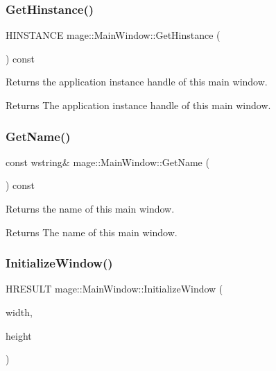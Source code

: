 \subsubsection{\texorpdfstring{Get\+Hinstance()}{GetHinstance()}}
{\footnotesize\ttfamily H\+I\+N\+S\+T\+A\+N\+CE mage\+::\+Main\+Window\+::\+Get\+Hinstance (\begin{DoxyParamCaption}{ }\end{DoxyParamCaption}) const}

Returns the application instance handle of this main window.

\begin{DoxyReturn}{Returns}
The application instance handle of this main window. 
\end{DoxyReturn}
\hypertarget{classmage_1_1_main_window_aa2b99118a5125d4effbd5c5d9352e7e0}{}\label{classmage_1_1_main_window_aa2b99118a5125d4effbd5c5d9352e7e0} 
\subsubsection{\texorpdfstring{Get\+Name()}{GetName()}}
{\footnotesize\ttfamily const wstring\& mage\+::\+Main\+Window\+::\+Get\+Name (\begin{DoxyParamCaption}{ }\end{DoxyParamCaption}) const}

Returns the name of this main window.

\begin{DoxyReturn}{Returns}
The name of this main window. 
\end{DoxyReturn}
\hypertarget{classmage_1_1_main_window_a167b4c2771e6caa819045cf75f9bba5f}{}\label{classmage_1_1_main_window_a167b4c2771e6caa819045cf75f9bba5f} 
\subsubsection{\texorpdfstring{Initialize\+Window()}{InitializeWindow()}\hspace{0.1cm}{\footnotesize\ttfamily [1/2]}}
{\footnotesize\ttfamily H\+R\+E\+S\+U\+LT mage\+::\+Main\+Window\+::\+Initialize\+Window (\begin{DoxyParamCaption}\item[{L\+O\+NG}]{width,  }\item[{L\+O\+NG}]{height }\end{DoxyParamCaption})\hspace{0.3cm}{\ttfamily [private]}}

